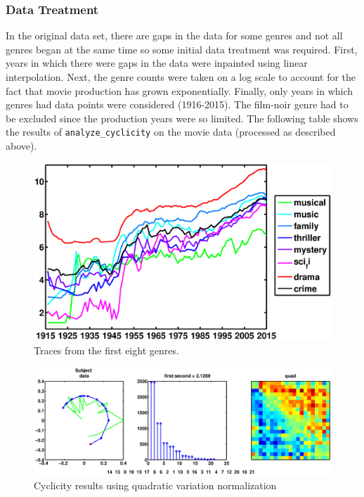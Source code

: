 \documentclass[11pt]{article}
\begin{document}
\subsubsection{Data Treatment}
In the original data set, there are gaps in the data for some genres and not all genres began at the same time so some initial data treatment was required. First, years in which there were gaps in the data were inpainted using linear interpolation. Next, the genre counts were taken on a log scale to account for the fact that movie production has grown exponentially. Finally, only years in which genres had data points were considered (1916-2015). The film-noir genre had to be excluded since the production years were so limited.
The following table shows the results of \verb|analyze_cyclicity| on the movie data (processed as described above). 
\begin{figure}[H]
\begin{minipage}{.3\textwidth}
\end{minipage}
\hfill
\begin{minipage}{.65\textwidth}
\includegraphics[width=\textwidth]{pictures/movie_data_all_yrs.eps}
\caption{Traces from the first eight genres.}
\end{minipage}
\end{figure}
\begin{figure}[H]
\centering
\includegraphics[trim= 130 0 130 0, clip, width=\textwidth]{pictures/movie_data_QC.eps}
\caption{Cyclicity results using quadratic variation normalization}
\end{figure}
\end{document}
